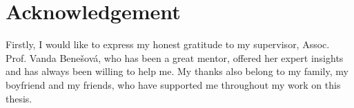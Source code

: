 \thispagestyle{empty}
\section*{Acknowledgement}

Firstly, I would like to express my honest gratitude to my supervisor, Assoc. Prof. Vanda Benešová, who has been a great mentor, offered her expert insights and has always been willing to help me. My thanks also belong to my family, my boyfriend and my friends, who have supported me throughout my work on this thesis.



\bigskip{}

\newpage{}\thispagestyle{empty}

\newpage
\thispagestyle{empty}
\mbox{}
\newpage

